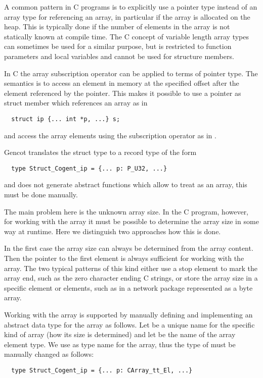 A common pattern in C programs is to explicitly use a pointer type instead of an array type for referencing an array,
in particular if the array is allocated on the heap. This is typically done if the number of elements in the
array is not statically known at compile time. The C concept of variable length array types can sometimes be
used for a similar purpose, but is restricted to function parameters and local variables and cannot be used for
structure members.

In C the array subscription operator can be applied to terms of pointer type. The semantics is to access an element 
in memory at the specified offset after the element referenced by the pointer. This makes it possible to use 
a pointer as struct member which references an array as in
\begin{verbatim}
  struct ip {... int *p, ...} s;
\end{verbatim}
and access the array elements using the subscription operator as in .

Gencot translates the struct type to a record type of the form
\begin{verbatim}
  type Struct_Cogent_ip = {... p: P_U32, ...}
\end{verbatim}
and does not generate abstract functions which allow to treat  as an array, this must be done manually.

The main problem here is the unknown array size. In the C program, however, for working with the array it must be
possible to determine the array size in some way at runtime. Here we distinguish two approaches how this is done.

In the first case the array size can always be determined from the array content. Then the pointer to the first 
element is always sufficient for working with the array. The two typical patterns of this kind either use a 
stop element to mark the array end, such as the zero character ending C strings, or store the array size in a
specific element or elements, such as in a network package represented as a byte array.

Working with the array is supported by manually defining and implementing an abstract data type for the array as follows.
Let  be a unique name for the specific kind of array (how its size is determined) and let  be the
name of the array element type. We use  as type name for the array, thus the 
type of  must be manually changed as follows:
\begin{verbatim}
  type Struct_Cogent_ip = {... p: CArray_tt_El, ...}
\end{verbatim}

